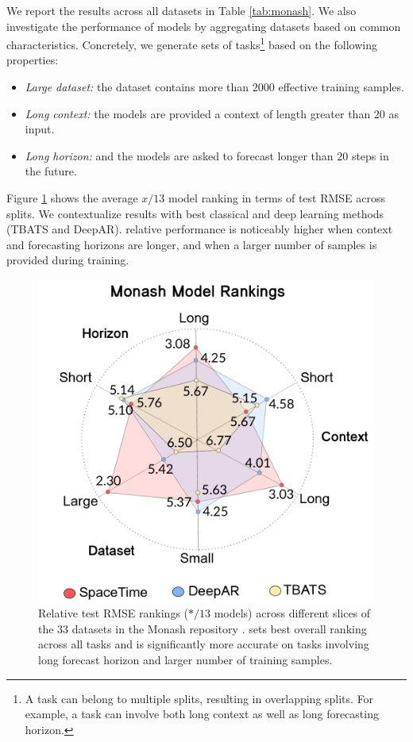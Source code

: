 We report the results across all datasets in Table \ref{tab:monash}. We also investigate the performance of models by aggregating datasets based on common characteristics. Concretely, we generate sets of tasks\footnote{A task can belong to multiple splits, resulting in overlapping splits. For example, a task can involve both long context as well as long forecasting horizon.} based on the following properties: 
\begin{itemize}
    \item \textit{Large dataset:} the dataset contains more than $2000$ effective training samples.
    \item \textit{Long context:} the models are provided a context of length greater than $20$ as input.
    \item \textit{Long horizon:} and the models are asked to forecast longer than $20$ steps in the future.
\end{itemize} 
Figure \ref{fig:monash_rankings} shows the average $x/13$ model ranking in terms of test RMSE across splits. We contextualize \ourmethod{} results with best classical and deep learning methods (TBATS and DeepAR). \ourmethod{} relative performance is noticeably higher when context and forecasting horizons are longer, and when a larger number of samples is provided during training. 


\begin{figure}[ht]
    \centering
    \includegraphics[width=0.5\linewidth]{_ICLR2023_paper/figures/monash_rankings2.pdf}
    \caption{ Relative test RMSE rankings ($*/13$ models) across different slices of the $33$ datasets in the Monash repository \citep{godahewa2021monash}. \ourmethod{} sets best overall ranking across all tasks and is significantly more accurate on tasks involving long forecast horizon and larger number of training samples.}
    \label{fig:monash_rankings}
\end{figure}


